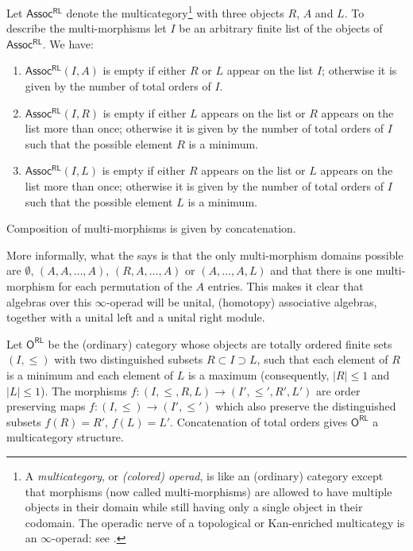 \documentclass[../text]{subfiles}
\begin{document}
\begin{construction}\label{con:assocRL}
    Let $\mathsf{Assoc^{RL}}$ denote the multicategory\footnote{A \emph{multicategory}, or \emph{(colored) operad}, is like an (ordinary) category except that morphisms (now called multi-morphisms) are allowed to have multiple objects in their domain while still having only a single object in their codomain. The operadic nerve of a topological or Kan-enriched multicategy is an $\infty$-operad: see \cite[Proposition 2.1.1.27]{lurie_ha}.} with three objects $R$, $A$ and $L$. To describe the multi-morphisms let $I$ be an arbitrary finite list of the objects of $\mathsf{Assoc^{RL}}$. We have:
    \begin{enumerate}
        \item $\mathsf{Assoc^{RL}}(I, A)$ is empty if either $R$ or $L$ appear on the list $I$; otherwise it is given by the number of total orders of $I$.
        \item $\mathsf{Assoc^{RL}}(I, R)$ is empty if either $L$ appears on the list or $R$ appears on the list more than once; otherwise it is given by the number of total orders of $I$ such that the possible element $R$ is a minimum.
        \item $\mathsf{Assoc^{RL}}(I, L)$ is empty if either $R$ appears on the list or $L$ appears on the list more than once; otherwise it is given by the number of total orders of $I$ such that the possible element $L$ is a minimum.
    \end{enumerate}
    Composition of multi-morphisms is given by concatenation. 
\end{construction}

\begin{remark}
    More informally, what the  says is that the only multi-morphism domains possible are $\emptyset$, $(A,A,\dots,A)$, $(R,A,\dots,A)$ or $(A,\dots,A, L)$ and that there is one multi-morphism for each permutation of the $A$ entries. This makes it clear that algebras over this $\infty$-operad will be unital, (homotopy) associative algebras, together with a unital left and a unital right module.
\end{remark}

\begin{construction}
    Let $\mathsf{O^{RL}}$ be the (ordinary) category whose objects are totally ordered finite sets $(I, \leq)$ with two distinguished subsets $R \subset I \supset L$, such that each element of $R$ is a minimum and each element of $L$ is a maximum (consequently, $|R| \leq 1$ and $|L| \leq 1$). The morphisms $f:(I, \leq, R, L) \xrightarrow{} (I', \leq', R', L')$ are order preserving maps $f: (I,\leq) \xrightarrow{} (I', \leq')$ which also preserve the distinguished subsets $f(R) = R'$, $f(L) = L'$. Concatenation of total orders gives $\mathsf{O^{RL}}$ a multicategory structure.
\end{construction}
\end{document}
